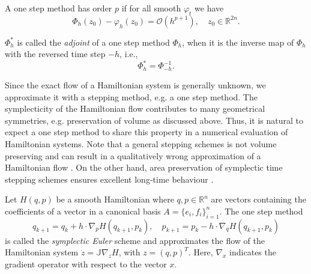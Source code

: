 \begin{definition}
A one step method has order $p$ if for all smooth $\varphi_t$ we have
\begin{equation} \label{eq:2.23}
	\Phi_h(z_0) - \varphi_h(z_0) = \mathcal O(h^{p+1}), \quad z_0 \in \mathbb R^{2n}.
\end{equation}
\end{definition}

\begin{definition}
	$\Phi_h^*$ is called the \emph{adjoint} of a one step method $\Phi_h$, when it is the inverse map of $\Phi_h$ with the reversed time step $-h$, i.e.,
\begin{equation} \label{eq:2.24}
	\Phi_h^* = \Phi^{-1}_{-h}.
\end{equation}
\end{definition}

Since the exact flow of a Hamiltonian system is generally unknown, we approximate it with a stepping method, e.g. a one step method. The symplecticity of the Hamiltonian flow contributes to many geometrical symmetries, e.g. preservation of volume as discussed above. Thus, it is natural to expect a one step method to share this property in a numerical evaluation of Hamiltonian systems. Note that a general stepping schemes is not volume preserving and can result in a qualitatively wrong approximation of a Hamiltonian flow \cite{hairer2006geometric}. On the other hand, area preservation of symplectic time stepping schemes ensures excellent long-time behaviour \cite{hairer2006geometric,blanes2016concise}.

\begin{definition}
Let $H(q,p)$ be a smooth Hamiltonian where $q,p\in\mathbb R^{n}$ are vectors containing the coefficients of a vector in a canonical basis $A = \{ e_i,f_i\}_{i=1}^n$. The one step method
\begin{equation}
	q_{k+1} = q_k + h \cdot \nabla_p H(q_{k+1},p_k),\quad p_{k+1} = p_k - h \cdot \nabla_q H(q_{k+1},p_k)
\end{equation}
is called the \emph{symplectic Euler} scheme and approximates the flow of the Hamiltonian system $\dot z = \mathbb J \nabla_z H$, with $z=(q,p)^T$. Here, $\nabla_x$ indicates the gradient operator with respect to the vector $x$.
\end{definition}

